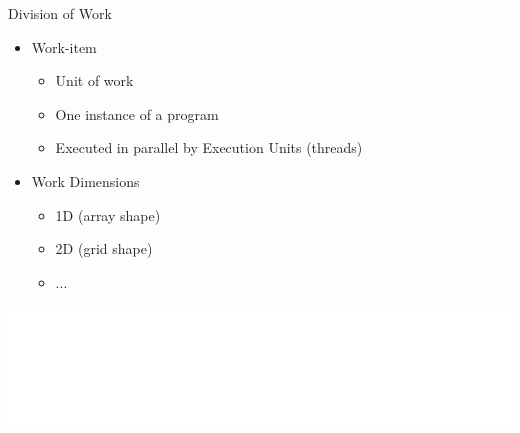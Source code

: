 \begin{frame}{Division of Work}

\begin{itemize}
    \item Work-item
    \begin{itemize}
        \item Unit of work
        \item One instance of a program
        \item Executed in parallel by Execution Units (threads)
    \end{itemize}
    \item Work Dimensions
    \begin{itemize}
        \item 1D (array shape)
        \item 2D (grid shape)
        \item ...
    \end{itemize}
\end{itemize}

\vspace{1ex}
\hspace{1em}\includegraphics[scale=0.75]{images/work-items.pdf}

\end{frame}


